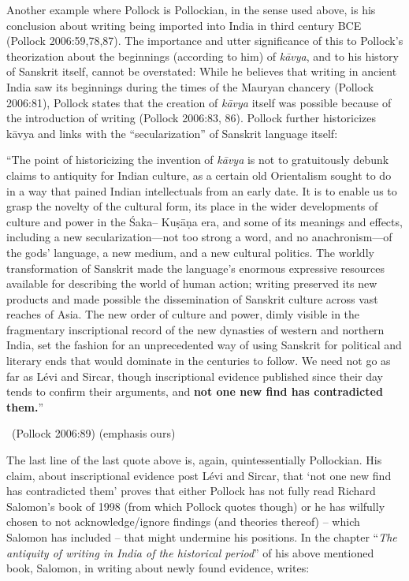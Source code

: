 Another example where Pollock is Pollockian, in the sense used above, is his conclusion about writing being imported into India in third century BCE (Pollock 2006:59,78,87). The importance and utter significance of this to Pollock’s theorization about the beginnings (according to him) of \textit{kāvya}, and to his history of Sanskrit itself, cannot be overstated: While he believes that writing in ancient India saw its beginnings during the times of the Mauryan chancery (Pollock 2006:81), Pollock states that the creation of \textit{kāvya} itself was possible because of the introduction of writing (Pollock 2006:83, 86). Pollock further historicizes kāvya and links with the “secularization” of Sanskrit language itself: 

\vskip 4pt

\begin{myquote}
“The point of historicizing the invention of \textit{kāvya} is not to gratuitously debunk claims to antiquity for Indian culture, as a certain old Orientalism sought to do in a way that pained Indian intellectuals from an early date. It is to enable us to grasp the novelty of the cultural form, its place in the wider developments of culture and power in the Śaka– Kuṣāṇa era, and some of its meanings and effects, including a new secularization—not too strong a word, and no anachronism—of the gods’ language, a new medium, and a new cultural politics. The worldly transformation of Sanskrit made the language’s enormous expressive resources available for describing the world of human action; writing preserved its new products and made possible the dissemination of Sanskrit culture across vast reaches of Asia. The new order of culture and power, dimly visible in the fragmentary inscriptional record of the new dynasties of western and northern India, set the fashion for an unprecedented way of using Sanskrit for political and literary ends that would dominate in the centuries to follow. We need not go as far as Lévi and Sircar, though inscriptional evidence published since their day tends to confirm their arguments, and \textbf{not one new find has contradicted them.}” 

~\hfill (Pollock 2006:89) (emphasis ours)
\end{myquote}

\vskip 4pt

The last line of the last quote above is, again, quintessentially Pollockian. His claim, about inscriptional evidence post Lévi and Sircar, that ‘not one new find has contradicted them’ proves that either Pollock has not fully read Richard Salomon’s book of 1998 (from which Pollock quotes though) or he has wilfully chosen to not acknowledge/ignore findings (and theories thereof) – which Salomon has included – that might undermine his positions. In the chapter “\textit{The antiquity of writing in India of the historical period}” of his above mentioned book, Salomon, in writing about newly found evidence, writes:

